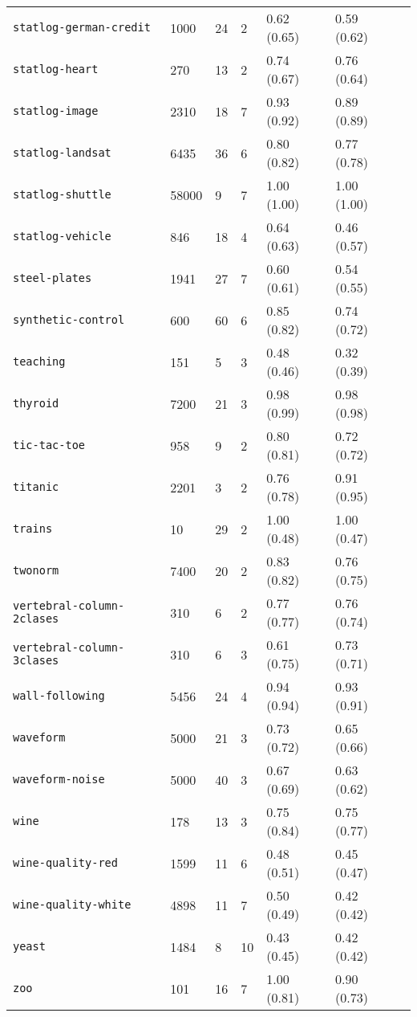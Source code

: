 \begin{tabular}{lllllll}
\verb!statlog-german-credit! & 1000 & 24 & 2 & 0.62 (0.65) & 0.59 (0.62)\\ 
\verb!statlog-heart! & 270 & 13 & 2 & 0.74 (0.67) & 0.76 (0.64)\\ 
\verb!statlog-image! & 2310 & 18 & 7 & 0.93 (0.92) & 0.89 (0.89)\\ 
\verb!statlog-landsat! & 6435 & 36 & 6 & 0.80 (0.82) & 0.77 (0.78)\\ 
\verb!statlog-shuttle! & 58000 & 9 & 7 & 1.00 (1.00) & 1.00 (1.00)\\ 
\verb!statlog-vehicle! & 846 & 18 & 4 & 0.64 (0.63) & 0.46 (0.57)\\ 
\verb!steel-plates! & 1941 & 27 & 7 & 0.60 (0.61) & 0.54 (0.55)\\ 
\verb!synthetic-control! & 600 & 60 & 6 & 0.85 (0.82) & 0.74 (0.72)\\ 
\verb!teaching! & 151 & 5 & 3 & 0.48 (0.46) & 0.32 (0.39)\\ 
\verb!thyroid! & 7200 & 21 & 3 & 0.98 (0.99) & 0.98 (0.98)\\ 
\verb!tic-tac-toe! & 958 & 9 & 2 & 0.80 (0.81) & 0.72 (0.72)\\ 
\verb!titanic! & 2201 & 3 & 2 & 0.76 (0.78) & 0.91 (0.95)\\ 
\verb!trains! & 10 & 29 & 2 & 1.00 (0.48) & 1.00 (0.47)\\ 
\verb!twonorm! & 7400 & 20 & 2 & 0.83 (0.82) & 0.76 (0.75)\\ 
\verb!vertebral-column-2clases! & 310 & 6 & 2 & 0.77 (0.77) & 0.76 (0.74)\\ 
\verb!vertebral-column-3clases! & 310 & 6 & 3 & 0.61 (0.75) & 0.73 (0.71)\\ 
\verb!wall-following! & 5456 & 24 & 4 & 0.94 (0.94) & 0.93 (0.91)\\ 
\verb!waveform! & 5000 & 21 & 3 & 0.73 (0.72) & 0.65 (0.66)\\ 
\verb!waveform-noise! & 5000 & 40 & 3 & 0.67 (0.69) & 0.63 (0.62)\\ 
\verb!wine! & 178 & 13 & 3 & 0.75 (0.84) & 0.75 (0.77)\\ 
\verb!wine-quality-red! & 1599 & 11 & 6 & 0.48 (0.51) & 0.45 (0.47)\\ 
\verb!wine-quality-white! & 4898 & 11 & 7 & 0.50 (0.49) & 0.42 (0.42)\\ 
\verb!yeast! & 1484 & 8 & 10 & 0.43 (0.45) & 0.42 (0.42)\\ 
\verb!zoo! & 101 & 16 & 7 & 1.00 (0.81) & 0.90 (0.73)\\ 
\bottomrule 
\end{tabular} 
